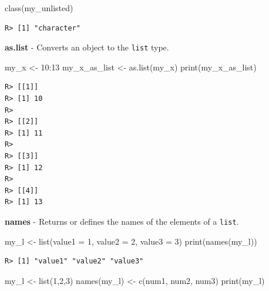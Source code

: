 \documentclass[
  12pt,
]{book}
\newenvironment{Shaded}{\begin{snugshade}}{\end{snugshade}}
\newcommand{\AttributeTok}[1]{\textcolor[rgb]{0.61,0.61,0.61}{#1}}
\newcommand{\DecValTok}[1]{\textcolor[rgb]{0.06,0.06,0.06}{#1}}
\newcommand{\FunctionTok}[1]{\textcolor[rgb]{0,0,0}{#1}}
\newcommand{\NormalTok}[1]{#1}
\newcommand{\OtherTok}[1]{\textcolor[rgb]{0.37,0.37,0.37}{#1}}
\newcommand{\SpecialCharTok}[1]{\textcolor[rgb]{0,0,0}{#1}}
\newcommand{\StringTok}[1]{\textcolor[rgb]{0.5,0.5,0.5}{#1}}
\begin{document}
\begin{Shaded}
\begin{Highlighting}[]
\FunctionTok{class}\NormalTok{(my\_unlisted)}
\end{Highlighting}
\end{Shaded}

\begin{verbatim}
R> [1] "character"
\end{verbatim}

\textbf{as.list} - Converts an object to the \texttt{list} type. 

\begin{Shaded}
\begin{Highlighting}[]
\NormalTok{my\_x }\OtherTok{\textless{}{-}} \DecValTok{10}\SpecialCharTok{:}\DecValTok{13}
\NormalTok{my\_x\_as\_list }\OtherTok{\textless{}{-}} \FunctionTok{as.list}\NormalTok{(my\_x)}
\FunctionTok{print}\NormalTok{(my\_x\_as\_list)}
\end{Highlighting}
\end{Shaded}

\begin{verbatim}
R> [[1]]
R> [1] 10
R> 
R> [[2]]
R> [1] 11
R> 
R> [[3]]
R> [1] 12
R> 
R> [[4]]
R> [1] 13
\end{verbatim}

\textbf{names} - Returns or defines the names of the elements of a \texttt{list}. 

\begin{Shaded}
\begin{Highlighting}[]
\NormalTok{my\_l }\OtherTok{\textless{}{-}} \FunctionTok{list}\NormalTok{(}\AttributeTok{value1 =} \DecValTok{1}\NormalTok{, }\AttributeTok{value2 =} \DecValTok{2}\NormalTok{, }\AttributeTok{value3 =} \DecValTok{3}\NormalTok{)}
\FunctionTok{print}\NormalTok{(}\FunctionTok{names}\NormalTok{(my\_l))}
\end{Highlighting}
\end{Shaded}

\begin{verbatim}
R> [1] "value1" "value2" "value3"
\end{verbatim}

\begin{Shaded}
\begin{Highlighting}[]
\NormalTok{my\_l }\OtherTok{\textless{}{-}} \FunctionTok{list}\NormalTok{(}\DecValTok{1}\NormalTok{,}\DecValTok{2}\NormalTok{,}\DecValTok{3}\NormalTok{)}
\FunctionTok{names}\NormalTok{(my\_l) }\OtherTok{\textless{}{-}} \FunctionTok{c}\NormalTok{(}\StringTok{\textquotesingle{}num1\textquotesingle{}}\NormalTok{, }\StringTok{\textquotesingle{}num2\textquotesingle{}}\NormalTok{, }\StringTok{\textquotesingle{}num3\textquotesingle{}}\NormalTok{)}
\FunctionTok{print}\NormalTok{(my\_l)}
\end{Highlighting}
\end{Shaded}
\end{document}
